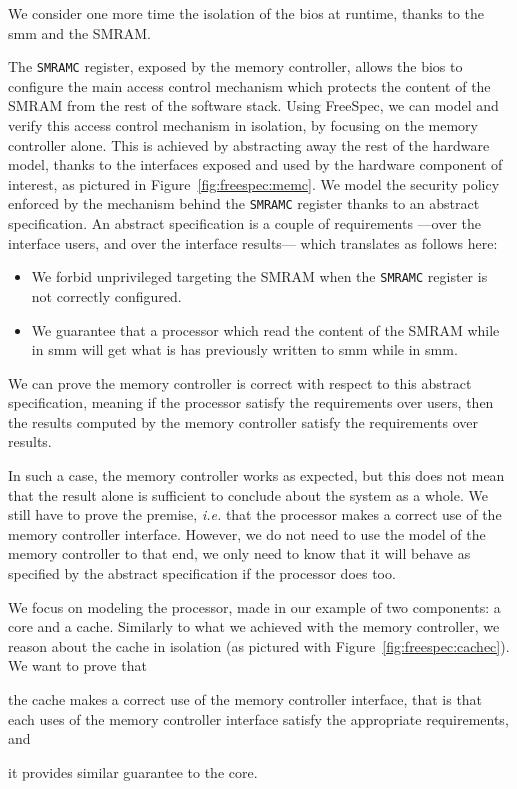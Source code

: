 \begin{example}
  We consider one more time the isolation of the \ac{bios} at runtime, thanks to
  the \ac{smm} and the SMRAM.

  The \texttt{SMRAMC} register, exposed by the memory controller, allows the
  \ac{bios} to configure the main access control mechanism which protects the
  content of the SMRAM from the rest of the software stack.
  Using FreeSpec, we can model and verify this access control mechanism in
  isolation, by focusing on the memory controller alone.
  This is achieved by abstracting away the rest of the hardware model, thanks to
  the interfaces exposed and used by the hardware component of interest, as
  pictured in Figure~\ref{fig:freespec:memc}.
  We model the security policy enforced by the mechanism behind the
  \texttt{SMRAMC} register thanks to an abstract specification.
  An abstract specification is a couple of requirements ---over the interface
  users, and over the interface results--- which translates as follows here:
  \begin{itemize}
  \item We forbid unprivileged \IO targeting the SMRAM when the \texttt{SMRAMC}
    register is not correctly configured.
  \item We guarantee that a processor which read the content of the SMRAM while
    in \ac{smm} will get what is has previously written to \ac{smm} while in
    \ac{smm}.
  \end{itemize}
  We can prove the memory controller is correct with respect to this abstract
  specification, meaning if the processor satisfy the requirements over users,
  then the results computed by the memory controller satisfy the requirements
  over results.

  In such a case, the memory controller works as expected, but this does not
  mean that the result alone is sufficient to conclude about the system as a
  whole.
  We still have to prove the premise, \emph{i.e.} that the processor makes a
  correct use of the memory controller interface.
  However, we do not need to use the model of the memory controller to that end,
  we only need to know that it will behave as specified by the abstract
  specification if the processor does too.

  We focus on modeling the processor, made in our example of two components: a
  core and a cache.
  Similarly to what we achieved with the memory controller, we reason about the
  cache in isolation (as pictured with Figure~\ref{fig:freespec:cachec}).
  We want to prove that
  \begin{inparaenum}
  \item the cache makes a correct use of the memory controller interface, that
    is that each uses of the memory controller interface satisfy the appropriate
    requirements, and
  \item it provides similar guarantee to the core.
  \end{inparaenum}


\end{example}

